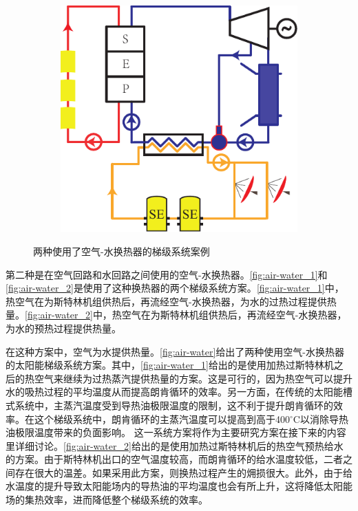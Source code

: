 \begin{figure}[htbp]
\begin{subfigure}[b]{0.4\columnwidth}
	\includegraphics[width = \columnwidth]{fig/air-water2}
	\caption{}
	\label{fig:air-water_2}
	\end{subfigure}
	\caption{两种使用了空气-水换热器的梯级系统案例}
	\label{fig:air-water}
\end{figure}

第二种是在空气回路和水回路之间使用的空气-水换热器。\autoref{fig:air-water_1}和\autoref{fig:air-water_2}是使用了这种换热器的两个梯级系统方案。\autoref{fig:air-water_1}中，热空气在为斯特林机组供热后，再流经空气-水换热器，为水的过热过程提供热量。\autoref{fig:air-water_2}中，热空气在为斯特林机组供热后，再流经空气-水换热器，为水的预热过程提供热量。

在这种方案中，空气为水提供热量。\autoref{fig:air-water}给出了两种使用空气-水换热器的太阳能梯级系统方案。其中，\autoref{fig:air-water_1}给出的是使用加热过斯特林机之后的热空气来继续为过热蒸汽提供热量的方案。这是可行的，因为热空气可以提升水的吸热过程的平均温度从而提高朗肯循环的效率。另一方面，在传统的太阳能槽式系统中，主蒸汽温度受到导热油极限温度的限制，这不利于提升朗肯循环的效率。在这个梯级系统中，朗肯循环的主蒸汽温度可以提高到高于400$\mathrm{^\circ C}$以消除导热油极限温度带来的负面影响。
这一系统方案将作为主要研究方案在接下来的内容里详细讨论。\autoref{fig:air-water_2}给出的是使用加热过斯特林机后的热空气预热给水的方案。由于斯特林机出口的空气温度较高，而朗肯循环的给水温度较低，二者之间存在很大的温差。如果采用此方案，则换热过程产生的㶲损很大。此外，由于给水温度的提升导致太阳能场内的导热油的平均温度也会有所上升，这将降低太阳能场的集热效率，进而降低整个梯级系统的效率。

